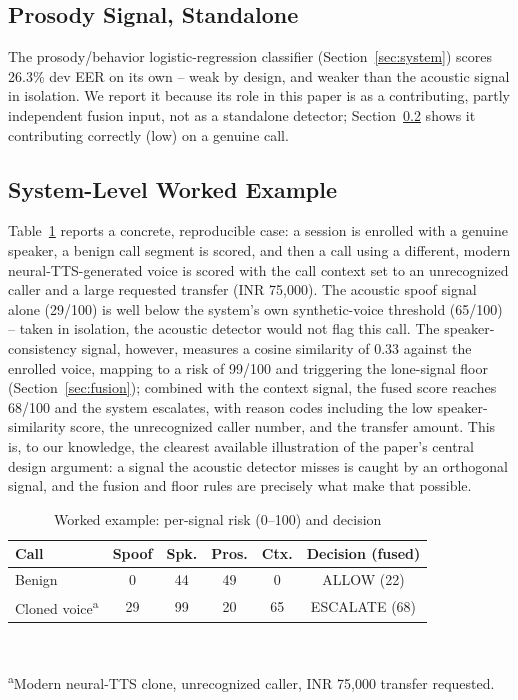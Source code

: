 \documentclass[conference]{IEEEtran}
\begin{document}
\subsection{Prosody Signal, Standalone}
The prosody/behavior logistic-regression classifier
(Section~\ref{sec:system}) scores 26.3\% dev EER on its own -- weak by
design, and weaker than the acoustic signal in isolation. We report it
because its role in this paper is as a contributing, partly independent
fusion input, not as a standalone detector; Section~\ref{sec:worked-example}
shows it contributing correctly (low) on a genuine call.

\subsection{System-Level Worked Example}
\label{sec:worked-example}
Table~\ref{tab:worked} reports a concrete, reproducible case: a session
is enrolled with a genuine speaker, a benign call segment is scored, and
then a call using a different, modern neural-TTS-generated voice is
scored with the call context set to an unrecognized caller and a large
requested transfer (INR 75{,}000). The acoustic spoof signal alone
(29/100) is well below the system's own synthetic-voice threshold
(65/100) -- taken in isolation, the acoustic detector would not flag
this call. The speaker-consistency signal, however, measures a cosine
similarity of 0.33 against the enrolled voice, mapping to a risk of
99/100 and triggering the lone-signal floor
(Section~\ref{sec:fusion}); combined with the context signal, the fused
score reaches 68/100 and the system escalates, with reason codes
including the low speaker-similarity score, the unrecognized caller
number, and the transfer amount. This is, to our knowledge, the clearest
available illustration of the paper's central design argument: a signal
the acoustic detector misses is caught by an orthogonal signal, and the
fusion and floor rules are precisely what make that possible.

\begin{table}[t]
\centering
\caption{Worked example: per-signal risk (0--100) and decision}
\label{tab:worked}
\begin{tabular}{@{}lccccc@{}}
\toprule
Call & Spoof & Spk. & Pros. & Ctx. & Decision (fused) \\
\midrule
Benign & 0 & 44 & 49 & 0 & ALLOW (22) \\
Cloned voice\textsuperscript{a} & 29 & 99 & 20 & 65 & ESCALATE (68) \\
\bottomrule
\end{tabular}
\\[2pt]
\raggedright\footnotesize\textsuperscript{a}Modern neural-TTS clone, unrecognized caller, INR 75{,}000 transfer requested.
\end{table}
\end{document}
